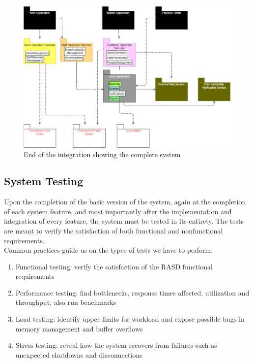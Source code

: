 \begin{enumerate}
	\begin{figure}[H]
		\includegraphics[width=\linewidth]{../Diagrams/IntegrationImplementation/IntegrationFull.png}
		\caption{End of the integration showing the complete system}
		\label{fig:Implementation5}
	\end{figure}
\end{enumerate}

\subsection{System Testing}
Upon the completion of the basic version of the system, again at the completion of each system feature, and most importantly after the implementation and integration of every feature, the system must be tested in its entirety. The tests are meant to verify the satisfaction of both functional and nonfunctional requirements.\\

Common practices guide us on the types of tests we have to perform:
\begin{enumerate}
	\item Functional testing: verify the satisfaction of the RASD functional requirements
	\item Performance testing: find bottlenecks, response times affected, utilization and throughput, also run benchmarks
	\item Load testing: identify upper limits for workload and expose possible bugs in memory management and buffer overflows
	\item Stress testing: reveal how the system recovers from failures such as unexpected shutdowns and disconnections
\end{enumerate}
